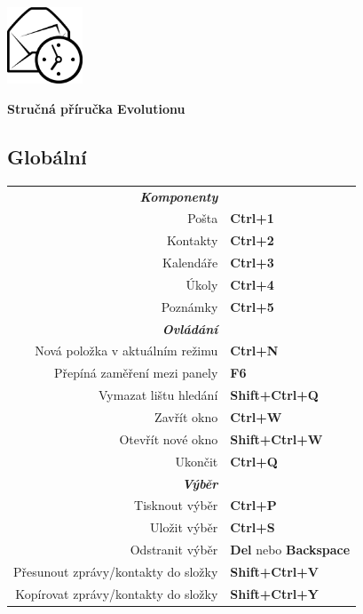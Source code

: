 \documentclass[12pt]{article}
\date {}
\begin{document}
	\begin{landscape}


	\begin{center}
	\begin{minipage}[m]
		{1in}\includegraphics[height=0.9in]{../evolution-logo.eps}\hspace{5mm}
	\end{minipage}
	\hspace{5mm}
	\textbf{\Huge{Stručná příručka Evolutionu}}
	\end{center}

	\begin{center}
	\begin{multicols}{2}
	\section*{Globální}
	\begin{tabular*}{4in}{rp{1.5in}}
		\textit{\textbf{Komponenty}}		&					\\
		Pošta					& \textbf{Ctrl+1}			\\
		Kontakty				& \textbf{Ctrl+2}			\\
		Kalendáře				& \textbf{Ctrl+3}			\\
		Úkoly					& \textbf{Ctrl+4}			\\
		\vspace{1.5mm}
		Poznámky				& \textbf{Ctrl+5}			\\
		\textit{\textbf{Ovládání}}		&					\\
		Nová položka v aktuálním režimu		& \textbf{Ctrl+N}			\\
		Přepíná zaměření mezi panely		& \textbf{F6}				\\
		Vymazat lištu hledání			& \textbf{Shift+Ctrl+Q}			\\
		Zavřít okno				& \textbf{Ctrl+W}			\\
		Otevřít nové okno			& \textbf{Shift+Ctrl+W}			\\
		\vspace{1.5mm}
		Ukončit					& \textbf{Ctrl+Q}			\\
		\textit{\textbf{Výběr}}			&					\\
		Tisknout výběr				& \textbf{Ctrl+P}			\\
		Uložit výběr				& \textbf{Ctrl+S}			\\
		Odstranit výběr				& \textbf{Del} nebo \textbf{Backspace}	\\
		Přesunout zprávy/kontakty do složky	& \textbf{Shift+Ctrl+V}			\\
		Kopírovat zprávy/kontakty do složky	& \textbf{Shift+Ctrl+Y}			\\
	\end{tabular*}

\end{multicols}
\end{center}
\end{landscape}
\end{document}
